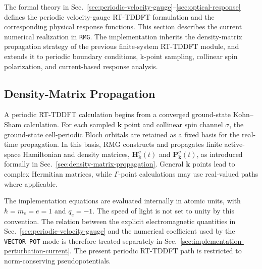 
The formal theory in
Sec.~\ref{sec:periodic-velocity-gauge}--\ref{sec:optical-response}
defines the periodic velocity-gauge RT-TDDFT formulation and the
corresponding physical response functions.  This section describes the
current numerical realization in \texttt{RMG}.  The implementation
inherits the density-matrix propagation strategy of the previous
finite-system RT-TDDFT module,\cite{jakowski-rmg-tddft-2025} and extends
it to periodic boundary conditions, k-point sampling, collinear spin
polarization, and current-based response analysis.

\subsection{Density-Matrix Propagation}
\label{sec:implementation-density-matrix}

A periodic RT-TDDFT calculation begins from a converged ground-state
Kohn--Sham calculation.  For each sampled $\mathbf k$ point and
collinear spin channel $\sigma$, the ground-state cell-periodic Bloch
orbitals are retained as a fixed basis for the real-time propagation.
In this basis, RMG constructs and propagates finite active-space
Hamiltonian and density matrices,
$\mathbf H_{\mathbf k}^{\sigma}(t)$ and
$\mathbf P_{\mathbf k}^{\sigma}(t)$, as introduced formally in
Sec.~\ref{sec:density-matrix-propagation}.  General $\mathbf k$ points
lead to complex Hermitian matrices, while $\Gamma$-point calculations
may use real-valued paths where applicable.

The implementation equations are evaluated internally in atomic units,
with $\hbar=m_e=e=1$ and $q_e=-1$.  The speed of light is not set to
unity by this convention.  The relation between the explicit
electromagnetic quantities in Sec.~\ref{sec:periodic-velocity-gauge}
and the numerical coefficient used by the \texttt{VECTOR\_POT} mode is
therefore treated separately in
Sec.~\ref{sec:implementation-perturbation-current}.  The present
periodic RT-TDDFT path is restricted to norm-conserving
pseudopotentials.

